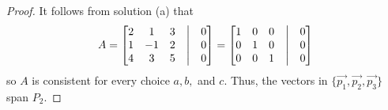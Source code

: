 \documentclass[12pt]{article}
\begin{document}
\begin{enumerate}
\begin{enumerate}
\begin{proof}
                                    It follows from solution (a) that
                                    \begin{align*}
                                            A =
                                            \begin{bmatrix}
                                                    2 & 1  & 3 & \bigm| & 0 \\
                                                    1 & -1 & 2 & \bigm| & 0 \\
                                                    4 & 3  & 5 & \bigm| & 0 \\
                                            \end{bmatrix}
                                            =
                                            \begin{bmatrix}
                                                    1 & 0 & 0 & \bigm| & 0 \\
                                                    0 & 1 & 0 & \bigm| & 0 \\
                                                    0 & 0 & 1 & \bigm| & 0 \\
                                            \end{bmatrix}
                                    \end{align*}
                                    so $A$ is consistent for every choice $a,b,$ and $c$.
                                    Thus, the vectors in $\{\vec{p_{1}},\vec{p_{2}},\vec{p_{3}}\}$ span $P_{2}$.
                            \end{proof}
                            \pagebreak

\end{enumerate}
\end{enumerate}
\end{document}
